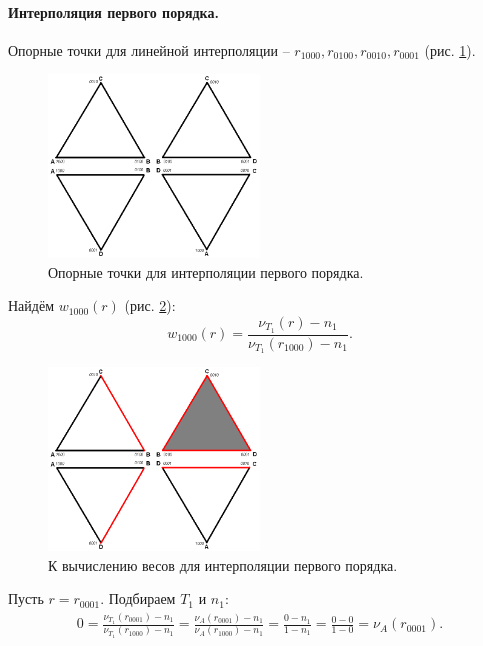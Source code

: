 \paragraph{Интерполяция первого порядка.} Опорные точки для линейной интерполяции -- $r_{1000}, r_{0100}, r_{0010}, r_{0001}$ (рис. \ref{pic:tetr-interpolation-1st-order-1}).

\begin{figure}[h]
\centering
\includegraphics[width=0.5\textwidth]{png/tetr-interp-1st-order-1.png}
\caption{Опорные точки для интерполяции первого порядка.}
\label{pic:tetr-interpolation-1st-order-1}
\end{figure}

Найдём $w_{1000}(r)$ (рис. \ref{pic:tetr-interpolation-1st-order-2}):
\begin{equation}
w_{1000}(r) = \frac{ \nu_{T_1}(r) - n_1 }{ \nu_{T_1}(r_{1000}) - n_1 }.
\end{equation}

\begin{figure}[h]
\centering
\includegraphics[width=0.5\textwidth]{png/tetr-interp-1st-order-2.png}
\caption{К вычислению весов для интерполяции первого порядка.}
\label{pic:tetr-interpolation-1st-order-2}
\end{figure}

Пусть $r = r_{0001}$. Подбираем $T_1$ и $n_1$:
\begin{align}
0 = \frac{ \nu_{T_1}(r_{0001}) - n_1 }{ \nu_{T_1}(r_{1000}) - n_1 } = \frac{ \nu_{A}(r_{0001}) - n_1 }{ \nu_{A}(r_{1000}) - n_1 } = \frac{0-n_1}{1-n_1} = \frac{0-0}{1-0} = \nu_{A}(r_{0001}).
\end{align}

